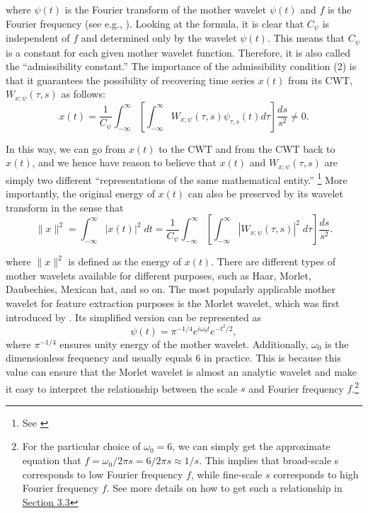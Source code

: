\documentclass[a4paper,fleqn]{cas-sc}
\begin{document}
where $\psi(t)$ is the Fourier transform of the mother wavelet $\psi(t)$ and $f$ is the Fourier frequency (see e.g., \cite{daubechies1992ten}). Looking at the formula, it is clear that $C_\psi$ is independent of $f$ and determined only by the wavelet $\psi(t)$. This means that $C_\psi$ is a constant for each given mother wavelet function. Therefore, it is also called the “admissibility constant.” The importance of the admissibility condition (2) is that it guarantees the possibility of recovering time series $x(t)$ from its CWT, $W_{x;\psi}(\tau, s)$ as follows:
\begin{equation}
    x(t)=\dfrac{1}{C_\psi}\int_{-\infty}^\infty\left[\int_{-\infty}^\infty W_{x;\psi}(\tau, s)\psi_{\tau,s}(t)d \tau \right] \dfrac{ds}{s^2}\neq 0.
\end{equation}

In this way, we can go from $x(t)$ to the CWT and from the CWT back to $x(t)$, and we hence have reason to believe that $x(t)$ and $W_{x;\psi}(\tau, s)$ are simply two different “representations of the same mathematical entity.” \footnote{See \citealt[p 2]{AGUIARCONRARIA2008}}  More importantly, the original energy of $x(t)$ can also be preserved by its wavelet transform in the sense that
\begin{equation}
    \|x\|^2 = \int_{-\infty}^\infty |x(t)|^2 \; dt = \dfrac{1}{C_\psi}\int_{-\infty}^\infty\left[\int_{-\infty}^\infty |W_{x;\psi}(\tau, s)|^2 \; d\tau \right] \dfrac{ds}{s^2}.
\end{equation}

where $\|x\|^2$ is defined as the energy of $x(t)$.
There are different types of mother wavelets available for different purposes, such as Haar, Morlet, Daubechies, Mexican hat, and so on. The most popularly applicable mother wavelet for feature extraction purposes is the Morlet wavelet, which was first introduced by \cite*{GOUPILLAUD1984}. Its simplified version can be represented as
\begin{equation}
    \psi(t)=\pi^{-1/4}e^{i\omega_0t}e^{-t^2/2},
\end{equation}
where $\pi^{-1/4}$ ensures unity energy of the mother wavelet. Additionally, $\omega_0$ is the dimensionless frequency and usually equals $6$ in practice. This is because this value can ensure that the Morlet wavelet is almost an analytic wavelet and make it easy to interpret the relationship between the scale $s$ and Fourier frequency $f$.\footnote{For the particular choice of $\omega_0 = 6$, we can simply get the approximate equation that $f = \omega_0/2\pi s = 6/2\pi s \approx 1/s$. This implies that broad-scale s corresponds to low Fourier frequency $f$, while fine-scale $s$ corresponds to high Fourier frequency $f$. See more details on how to get such a relationship in \hyperref[sec:3.3]{Section 3.3}}
\end{document}
